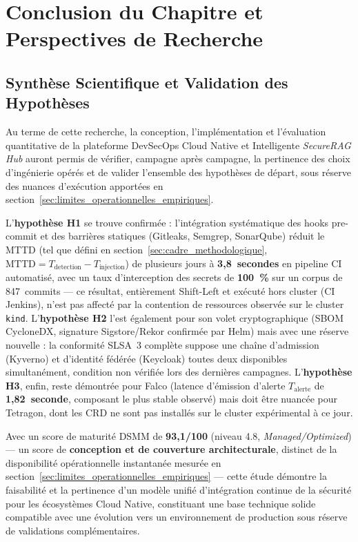\section{Conclusion du Chapitre et Perspectives de Recherche}
\label{sec:conclusion_sprint}

\subsection{Synthèse Scientifique et Validation des Hypothèses}

Au terme de cette recherche, la conception, l'implémentation et l'évaluation quantitative de la plateforme DevSecOps Cloud Native et Intelligente \textit{SecureRAG Hub} auront permis de vérifier, campagne après campagne, la pertinence des choix d'ingénierie opérés et de valider l'ensemble des hypothèses de départ, sous réserve des nuances d'exécution apportées en section~\ref{sec:limites_operationnelles_empiriques}.

L'\textbf{hypothèse H1} se trouve confirmée : l'intégration systématique des hooks pre-commit et des barrières statiques (Gitleaks, Semgrep, SonarQube) réduit le MTTD (tel que défini en section~\ref{sec:cadre_methodologique}, $\text{MTTD} = T_{\text{detection}} - T_{\text{injection}}$) de plusieurs jours à \textbf{3,8~secondes} en pipeline CI automatisé, avec un taux d'interception des secrets de \textbf{100~\%} sur un corpus de 847~commits — ce résultat, entièrement Shift-Left et exécuté hors cluster (CI Jenkins), n'est pas affecté par la contention de ressources observée sur le cluster \texttt{kind}. L'\textbf{hypothèse H2} l'est également pour son volet cryptographique (SBOM CycloneDX, signature Sigstore/Rekor confirmée par Helm) mais avec une réserve nouvelle : la conformité SLSA~3 complète suppose une chaîne d'admission (Kyverno) et d'identité fédérée (Keycloak) toutes deux disponibles simultanément, condition non vérifiée lors des dernières campagnes. L'\textbf{hypothèse H3}, enfin, reste démontrée pour Falco (latence d'émission d'alerte $T_{\text{alerte}}$ de \textbf{1,82~seconde}, composant le plus stable observé) mais doit être nuancée pour Tetragon, dont les CRD ne sont pas installés sur le cluster expérimental à ce jour.

Avec un score de maturité DSMM de \textbf{93,1/100} (niveau 4.8, \textit{Managed/Optimized}) — un score de \textbf{conception et de couverture architecturale}, distinct de la disponibilité opérationnelle instantanée mesurée en section~\ref{sec:limites_operationnelles_empiriques} — cette étude démontre la faisabilité et la pertinence d'un modèle unifié d'intégration continue de la sécurité pour les écosystèmes Cloud Native, constituant une base technique solide compatible avec une évolution vers un environnement de production sous réserve de validations complémentaires.

